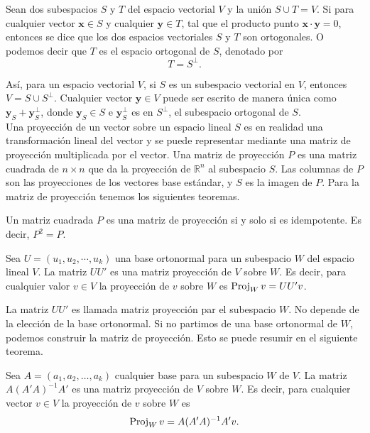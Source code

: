 Sean dos subespacios $S$ y $T$ del espacio vectorial $V$ y la unión $S\cup T = V$. Si para cualquier vector $\textbf{x}\in S$ y cualquier $\textbf{y}\in T$, tal que el producto punto $\textbf{x}\cdot \textbf{y}=0$, entonces se dice que los dos espacios vectoriales $S$ y $T$ son ortogonales. O podemos decir que $T$ es el espacio ortogonal de $S$, denotado por 
$$T=S^{\perp}.$$

Así, para un espacio vectorial $V$, si $S$ es un subespacio vectorial en $V$, entonces $V=S\cup S^{\perp}$. Cualquier vector $\textbf{y}\in V$ puede ser escrito de manera única como $\textbf{y}_{S}+\textbf{y}_S^{\perp}$, donde $\textbf{y}_S\in S$ e $\textbf{y}_S^{\perp}$ es en $S^{\perp}$, el subespacio ortogonal de $S$.\\

Una proyección de un vector sobre un espacio lineal $S$ es en realidad una transformación lineal del vector y se puede representar mediante una matriz de proyección multiplicada por el vector. Una matriz de proyección $P$ es una matriz cuadrada de $n \times n$ que da la proyección de $\mathbb{R}^n$ al subespacio $S$. Las columnas de $P$ son las proyecciones de los vectores base estándar, y $S$ es la imagen de $P$. Para la matriz de proyección tenemos los siguientes teoremas.

\begin{teo}
    Un matriz cuadrada $P$ es una matriz de proyección si y solo si es idempotente. Es decir, $P^2=P$.
\end{teo}

\begin{teo}
    Sea $U=(u_1,u_2,\cdots , u_k)$ una base ortonormal para un subespacio $W$ del espacio lineal $V$. La matriz $UU'$ es una matriz proyección de $V$ sobre $W$. Es decir, para cualquier valor $v\in V$ la proyección  de $v$ sobre $W$ es $\mathop{\mbox{\normalfont Proj}}\nolimits_W v=UU'v$.
\end{teo}

La matriz $UU'$ es llamada matriz proyección  par el subespacio $W$. No depende de la elección de la base ortonormal. Si no partimos de una base ortonormal de $W$, podemos construir la matriz de proyección. Esto se puede resumir en el siguiente teorema.

\begin{teo}
    Sea $A=(a_1,a_2,\ldots,a_k)$ cualquier base para un subespacio $W$ de $V$. La matriz $A(A'A)^{-1}A'$ es una matriz proyección de $V$ sobre $W$. Es decir, para cualquier vector $v\in V$ la proyección de $v$ sobre $W$ es
    \begin{equation}
	\mathop{\mbox{\normalfont Proj}}\nolimits_W v=A(A'A)^{-1}A'v.
    \end{equation}
\end{teo}

